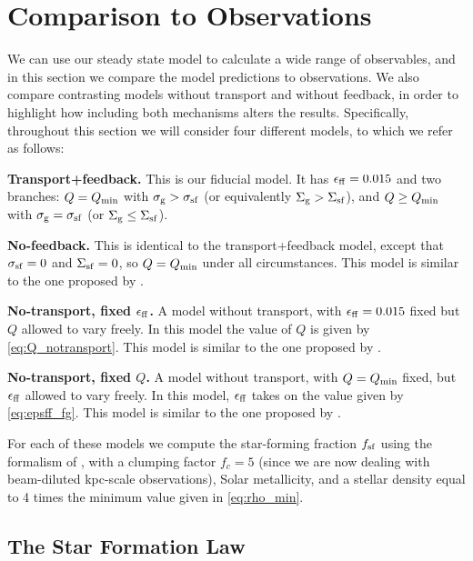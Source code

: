 \documentclass[useAMS,usenatbib]{mn2e}
\newcommand{\Qmin}{Q_{\rm min}}
\begin{document}
\section{Comparison to Observations}
\label{sec:observations}

We can use our steady state model to calculate a wide range of observables, and in this section we compare the model predictions to observations. We also compare contrasting models without transport and without feedback, in order to highlight how including both mechanisms alters the results. Specifically, throughout this section we will consider four different models, to which we refer as follows:

\textbf{Transport+feedback.} This is our fiducial model. It has $\epsilon_{\rm ff} = 0.015$ and two branches: $Q = \Qmin$ with $\sigma_{\rm g} > \sigma_{\rm sf}$ (or equivalently $\Sigma_{\rm g} > \Sigma_{\rm sf}$), and $Q \geq \Qmin$ with $\sigma_{\rm g} = \sigma_{\rm sf}$ (or $\Sigma_{\rm g} \leq \Sigma_{\rm sf}$). 

\textbf{No-feedback.} This is identical to the transport+feedback model, except that $\sigma_{\rm sf} = 0$ and $\Sigma_{\rm sf} = 0$, so $Q = \Qmin$ under all circumstances. This model is similar to the one proposed by \citet{krumholz10c}.

\textbf{No-transport, fixed $\epsilon_{\rm ff}$.} A model without transport, with $\epsilon_{\rm ff} = 0.015$ fixed but $Q$ allowed to vary freely. In this model the value of $Q$ is given by \autoref{eq:Q_notransport}. This model is similar to the one proposed by \citet{ostriker11a}.

\textbf{No-transport, fixed $Q$.} A model without transport, with $Q = \Qmin$ fixed, but $\epsilon_{\rm ff}$ allowed to vary freely. In this model, $\epsilon_{\rm ff}$ takes on the value given by \autoref{eq:epsff_fg}. This model is similar to the one proposed by \citet{faucher-giguere13a}.

For each of these models we compute the star-forming fraction $f_{\rm sf}$ using the formalism of \citet{krumholz13c}, with a clumping factor $f_c = 5$ (since we are now dealing with beam-diluted kpc-scale observations), Solar metallicity, and a stellar density equal to 4 times the minimum value given in \autoref{eq:rho_min}.

\subsection{The Star Formation Law}
\label{ssec:sflaw}
\end{document}
